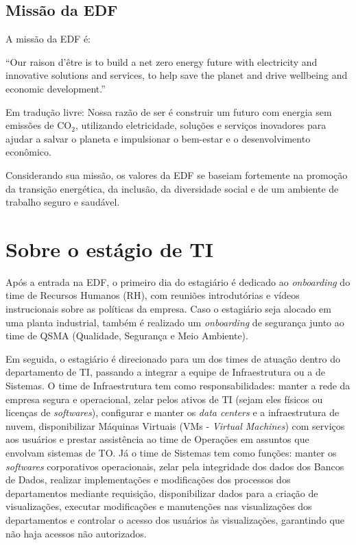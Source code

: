 \subsection{Missão da EDF}
A missão da EDF é:

``Our raison d’être is to build a net zero energy future with electricity and innovative solutions and services, to help save the planet and drive wellbeing and economic development.''  \cite{EDF_PS_Missao}


Em tradução livre: 
Nossa razão de ser é construir um futuro com energia sem emissões de $\text{CO}_2$, utilizando eletricidade, soluções e serviços inovadores para ajudar a salvar o planeta e impulsionar o bem-estar e o desenvolvimento econômico.


Considerando sua missão, os valores da EDF se baseiam fortemente na promoção da transição energética, da inclusão, da diversidade social e de um ambiente de trabalho seguro e saudável.

\section{Sobre o estágio de TI}


Após a entrada na EDF, o primeiro dia do estagiário é dedicado ao \textit{onboarding} do time de Recursos Humanos (RH), com  reuniões introdutórias e vídeos instrucionais sobre as políticas da empresa. Caso o estagiário seja alocado em uma planta industrial, também é realizado um \textit{onboarding} de segurança junto ao time de QSMA (Qualidade, Segurança e Meio Ambiente). 


Em seguida, o estagiário é direcionado para um dos times de atuação dentro do departamento de TI, passando a integrar a equipe de Infraestrutura ou a de Sistemas.
O time de Infraestrutura tem como responsabilidades:  manter a rede da empresa segura e operacional, zelar pelos ativos de TI (sejam eles físicos ou licenças de \textit{softwares}), configurar e manter os \textit{data centers} e a infraestrutura de nuvem, disponibilizar Máquinas Virtuais (VMs - \textit{Virtual Machines}) com  serviços aos usuários e prestar assistência ao time de Operações em assuntos que envolvam sistemas de TO. Já o time de Sistemas tem como funções: manter os \textit{softwares} corporativos operacionais, zelar pela integridade dos dados dos Bancos de Dados, realizar implementações e modificações dos processos dos departamentos mediante requisição, disponibilizar dados para a criação de visualizações, executar modificações e manutenções nas visualizações dos departamentos e controlar o acesso dos usuários às visualizações, garantindo que não haja acessos não autorizados.


